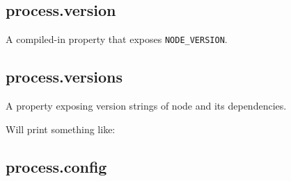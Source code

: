\subsection{process.version}

A compiled-in property that exposes \texttt{NODE\_VERSION}.

\begin{Shaded}
\begin{Highlighting}[]
\NormalTok{(} \NormalTok{+ }\NormalTok{);}
\end{Highlighting}
\end{Shaded}

\subsection{process.versions}

A property exposing version strings of node and its dependencies.

\begin{Shaded}
\begin{Highlighting}[]
\NormalTok{(}\NormalTok{);}
\end{Highlighting}
\end{Shaded}

Will print something like:

\begin{Shaded}
\begin{Highlighting}[]
\NormalTok{\{ }\NormalTok{: }\NormalTok{,}
  \NormalTok{: }\NormalTok{,}
  \NormalTok{: }\NormalTok{,}
  \NormalTok{: }\NormalTok{,}
  \NormalTok{: }\NormalTok{,}
  \NormalTok{: }\NormalTok{,}
  \NormalTok{: }\NormalTok{,}
  \NormalTok{: } \NormalTok{\}}
\end{Highlighting}
\end{Shaded}

\subsection{process.config}

